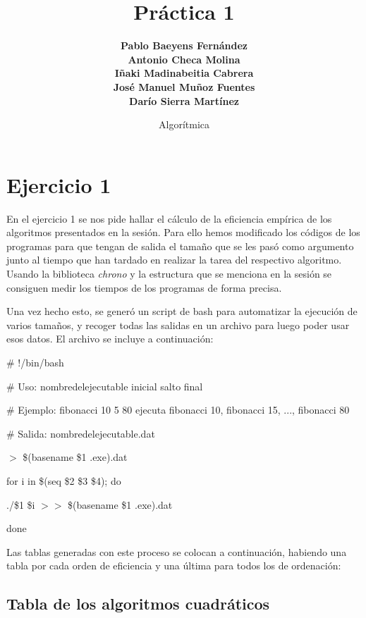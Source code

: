 \documentclass[a4paper, 11pt]{article}
\title{\Huge \textbf{Práctica 1}}
\author{\textbf{Pablo Baeyens Fernández} \\ \textbf{Antonio Checa Molina} \\
\textbf{Iñaki Madinabeitia Cabrera} \\  \textbf{José Manuel Muñoz Fuentes} \\
 \textbf{Darío Sierra Martínez} \\ }
\date{Algorítmica}
\begin{document}
\maketitle
\tableofcontents

\newpage
\section{Ejercicio 1}
En el ejercicio 1 se nos pide hallar el cálculo de la eficiencia empírica de los
algoritmos presentados en la sesión. Para ello hemos modificado los códigos de
los programas para que tengan de salida el tamaño que se les pasó como argumento
junto al tiempo que han tardado en realizar la tarea del respectivo algoritmo.
Usando la biblioteca \textit{chrono} y la estructura que se menciona en la
sesión se consiguen medir los tiempos de los programas de forma precisa.

Una vez hecho esto, se generó un script de bash para automatizar la ejecución de
varios tamaños, y recoger todas las salidas en un archivo para luego poder usar
esos datos. El archivo se incluye a continuación:


\begin{framed}

	\# !/bin/bash

	\# Uso: nombredelejecutable inicial salto final

	\# Ejemplo: fibonacci 10 5 80 ejecuta fibonacci 10, fibonacci 15, ..., fibonacci 80

	\# Salida: nombredelejecutable.dat
	\vspace{0.3cm}

	$>$ \$(basename \$1 .exe).dat

	for i in \$(seq \$2 \$3 \$4); do

	\hspace{0.4cm}./\$1 \$i $>>$ \$(basename \$1 .exe).dat

	done

\end{framed}

Las tablas generadas con este proceso se colocan a continuación, habiendo una tabla
por cada orden de eficiencia y una última para todos los de ordenación:

\subsection{Tabla de los algoritmos cuadráticos}

\end{document}
